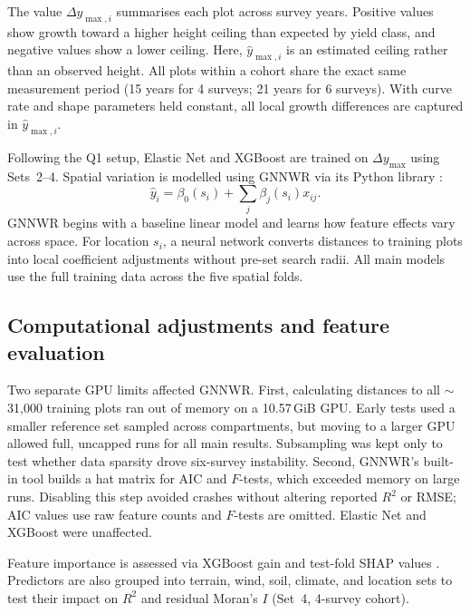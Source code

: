 The value $\Delta y_{\max,i}$ summarises each plot across survey years. Positive values show growth toward a higher height ceiling than expected by yield class, and negative values show a lower ceiling. Here, $\hat{y}_{\max,i}$ is an estimated ceiling rather than an observed height. All plots within a cohort share the exact same measurement period (15 years for 4 surveys; 21 years for 6 surveys). With curve rate and shape parameters held constant, all local growth differences are captured in $\hat{y}_{\max,i}$. 

Following the Q1 setup, Elastic Net and XGBoost are trained on $\Delta y_{\max}$ using Sets~2--4. Spatial variation is modelled using GNNWR via its Python library \cite{du2020Geographically_C6_GWR, du2022PyGNNWR_C6_GWR}:
\begin{equation}
\hat{y}_i = \beta_0(s_i) + \sum_j \beta_j(s_i) x_{ij}.
\label{eq:gnnwr}
\end{equation}
GNNWR begins with a baseline linear model and learns how feature effects vary across space. For location $s_i$, a neural network converts distances to training plots into local coefficient adjustments without pre-set search radii. All main models use the full training data across the five spatial folds.

\subsection*{Computational adjustments and feature evaluation}
Two separate GPU limits affected GNNWR. First, calculating distances to all $\sim$31,000 training plots ran out of memory on a 10.57\,GiB GPU. Early tests used a smaller reference set sampled across compartments, but moving to a larger GPU allowed full, uncapped runs for all main results. Subsampling was kept only to test whether data sparsity drove six-survey instability. Second, GNNWR's built-in tool builds a hat matrix for AIC and $F$-tests, which exceeded memory on large runs. Disabling this step avoided crashes without altering reported $R^2$ or RMSE; AIC values use raw feature counts and $F$-tests are omitted. Elastic Net and XGBoost were unaffected.

Feature importance is assessed via XGBoost gain and test-fold SHAP values \cite{lundberg2017unified}. %
Predictors are also grouped into terrain, wind, soil, climate, and location sets to test their impact on $R^2$ and residual Moran's $I$ (Set~4, 4-survey cohort).


